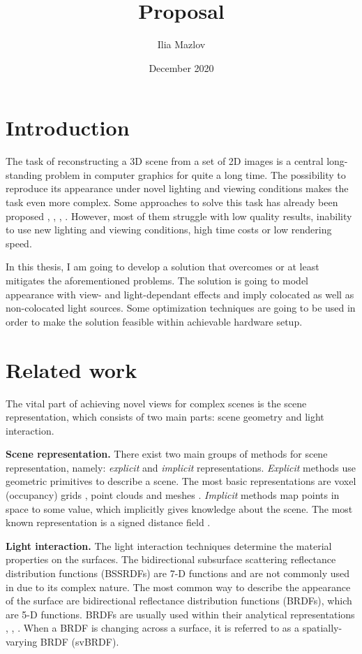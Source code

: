 \documentclass[english]{article}
\title{Proposal}
\author{Ilia Mazlov}
\date{December 2020}
\begin{document}
\maketitle

\section{Introduction}

The task of reconstructing a 3D scene from a set of 2D images is a central long-standing problem in computer graphics for quite a long time. The possibility to reproduce its appearance under novel lighting and viewing conditions makes the task even more complex. Some approaches to solve this task has already been proposed \cite{lombardi2019}, \cite{nerf2020mildenhall}, \cite{nrf2020}, \cite{nsvf2020}. However, most of them struggle with low quality results, inability to use new lighting and viewing conditions, high time costs or low rendering speed.

In this thesis, I am going to develop a solution that overcomes or at least mitigates the aforementioned problems. The solution is going to model appearance with view- and light-dependant effects and imply colocated as well as non-colocated light sources. Some optimization techniques are going to be used in order to make the solution feasible within achievable hardware setup.

\section{Related work}

The vital part of achieving novel views for complex scenes is the scene representation, which consists of two main parts: scene geometry and light interaction.

\textbf{Scene representation.} There exist two main groups of methods for scene representation, namely: \emph{explicit} and \emph{implicit} representations.
\emph{Explicit} methods use geometric primitives to describe a scene.
The most basic representations are voxel (occupancy) grids \cite{nsvf2020}, point clouds \cite{qi2017pointnet} and meshes \cite{jack2018learning}.
\emph{Implicit} methods map points in space to some value, which implicitly gives knowledge about the scene.
The most known representation is a signed distance field \cite{curless1996}.

\textbf{Light interaction.} The light interaction techniques determine the material properties on the surfaces.
The bidirectional subsurface scattering reflectance distribution functions (BSSRDFs) are 7-D functions and are not commonly used in due to its complex nature.
The most common way to describe the appearance of the surface are bidirectional reflectance distribution functions (BRDFs), which are 5-D functions.
BRDFs are usually used within their analytical representations \cite{oren1994}, \cite{cook1982}, \cite{phong1975}.
When a BRDF is changing across a surface, it is referred to as a spatially-varying BRDF (svBRDF).
\end{document}
